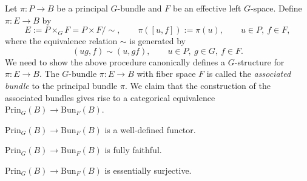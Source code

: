\documentclass{../../large}
\begin{document}
\begin{prb}
Let $\pi:P\to B$ be a principal $G$-bundle and $F$ be an effective left $G$-space.
Define $\pi:E\to B$ by
\[E:=P\times_GF=P\times F/\sim,\qquad \pi([u,f]):=\pi(u),\qquad u\in P,\ f\in F,\]
where the equivalence relation $\sim$ is generated by
\[(ug,f)\sim(u,gf),\qquad u\in P,\ g\in G,\ f\in F.\]
We need to show the above procedure canonically defines a $G$-structure for $\pi:E\to B$.
The $G$-bundle $\pi:E\to B$ with fiber space $F$ is called the \emph{associated bundle} to the principal bundle $\pi$.
We claim that the construction of the associated bundles gives rise to a categorical equivalence $\mathrm{Prin}_G(B)\to\mathrm{Bun}_F(B)$.
\begin{parts}
\item $\mathrm{Prin}_G(B)\to\mathrm{Bun}_F(B)$ is a well-defined functor.
\item $\mathrm{Prin}_G(B)\to\mathrm{Bun}_F(B)$ is fully faithful.
\item $\mathrm{Prin}_G(B)\to\mathrm{Bun}_F(B)$ is essentially surjective.
\end{parts}
\end{prb}
\end{document}
